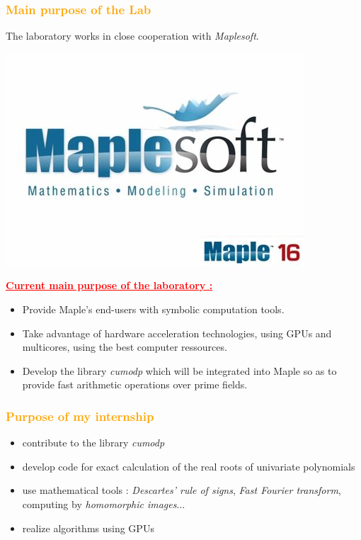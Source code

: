 \begin{frame}[fragile]
\frametitle{\textbf{\textcolor{orange}{Main purpose of the Lab}}}

The laboratory works in close cooperation with \textit{Maplesoft}.

\begin{center}
\includegraphics[scale=0.2]{Maple.jpg}
\end{center}

\begin{block}{}
\textcolor{red}{\underline{\textbf{Current main purpose of the laboratory :}}}
\begin{itemize}
\item Provide {\sc Maple}'s end-users with symbolic computation tools.
\item Take advantage of hardware acceleration technologies, using GPUs and multicores, using the best computer ressources.
\item Develop the library \textit{cumodp} which will be integrated into {\sc Maple} so as to provide fast arithmetic operations over prime fields.
\end{itemize}
\end{block}

\end{frame}

\begin{frame}[fragile]
\frametitle{\textbf{\textcolor{orange}{Purpose of my internship}}}

\begin{block}{}
\begin{itemize}
\item contribute to the library \textit{cumodp}
\item develop code for exact calculation of the real roots of univariate polynomials
\item use mathematical tools : \textit{Descartes' rule of signs}, \textit{Fast Fourier transform}, computing by \textit{homomorphic images}...
\item realize algorithms using GPUs
\end{itemize}
\end{block}

\end{frame}
